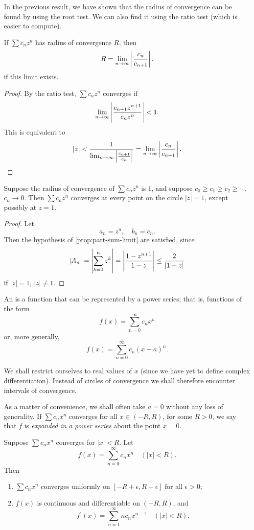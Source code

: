 In the previous result, we have shown that the radius of convergence can be found by using the root test. We can also find it using the ratio test (which is easier to compute).

\begin{lemma}
If $\sum c_nz^n$ has radius of convergence $R$, then
\[R=\lim_{n\to\infty}\left|\frac{c_n}{c_{n+1}}\right|,\]
if this limit exists.
\end{lemma}

\begin{proof}
By the ratio test, $\sum c_nz^n$ converges if 
\[\lim_{n\to\infty}\left|\frac{c_{n+1}z^{n+1}}{c_nz^n}\right|<1.\]
This is equivalent to
\[|z|<\frac{1}{\lim_{n\to\infty}\left|\frac{c_{n+1}}{c_n}\right|}=\lim_{n\to\infty}\left|\frac{c_n}{c_{n+1}}\right|.\]
\end{proof}

\begin{proposition}
Suppose the radius of convergence of $\sum c_nz^n$ is $1$, and suppose $c_0\ge c_1\ge c_2\ge\cdots$, $c_n\to0$. Then $\sum c_nz^n$ converges at every point on the circle $|z|=1$, except possibly at $z=1$.
\end{proposition}

\begin{proof}
Let
\[a_n=z^n,\quad b_n=c_n.\]
Then the hypothesis of \cref{prop:part-sum-limit} are satisfied, since
\[|A_n|=\left|\sum_{k=0}^{n}z^k\right|=\left|\frac{1-z^{n+1}}{1-z}\right|\le\frac{2}{|1-z|}\]
if $|z|=1$, $|z|\neq1$.
\end{proof}

\begin{definition}
An  is a function that can be represented by a power series; that is, functions of the form
\[f(x)=\sum_{n=0}^\infty c_n x^n\]
or, more generally,
\[f(x)=\sum_{n=0}^\infty c_n(x-a)^n.\]
\end{definition}

We shall restrict ourselves to real values of $x$ (since we have yet to define complex differentiation). Instead of circles of convergence we shall therefore encounter intervals of convergence. 

As a matter of convenience, we shall often take $a=0$ without any loss of generality. If $\sum c_nx^n$ converges for all $x\in(-R,R)$, for some $R>0$, we say that $f$ is \emph{expanded in a power series} about the point $x=0$.

\begin{proposition}
Suppose $\sum c_nx^n$ converges for $|x|<R$. Let
\[f(x)=\sum_{n=0}^{\infty}c_nx^n\quad(|x|<R).\]
Then
\begin{enumerate}[label=(\roman*)]
\item $\sum c_nx^n$ converges uniformly on $[-R+\epsilon,R-\epsilon]$ for all $\epsilon>0$;
\item $f(x)$ is continuous and differentiable on $(-R,R)$, and 
\[f^\prime(x)=\sum_{n=1}^\infty nc_nx^{n-1}\quad(|x|<R).\]
\end{enumerate}
\end{proposition}

